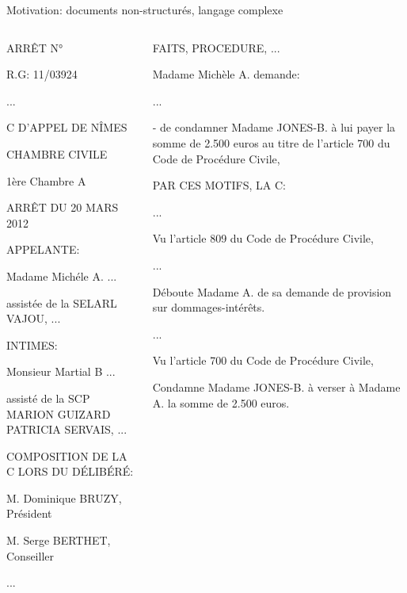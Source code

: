 \documentclass[newPxFont,pagenumber]{beamer}
\begin{document}
\begin{frame}{Motivation: documents non-structurés, langage complexe}
\scriptsize
\begin{columns}
\begin{column}{.50\linewidth}
ARRÊT N°

R.G: 11/03924

...

{C D'APPEL} DE {NÎMES}

{CHAMBRE CIVILE}

{1ère Chambre A}

ARRÊT DU {20 MARS 2012}

APPELANTE:

{Madame Michéle A.} ...

assistée de la {SELARL VAJOU}, ...

INTIMES:

{Monsieur Martial B} ...

assisté de la {SCP MARION GUIZARD PATRICIA SERVAIS}, ...

COMPOSITION DE LA C LORS DU DÉLIBÉRÉ:

{M. Dominique BRUZY, Président}

{M. Serge BERTHET, Conseiller}

...
\end{column}
\begin{column}{.50\linewidth}
FAITS, PROCEDURE, ...

Madame Michèle A. demande:

...

- de condamner Madame JONES-B. à lui payer la somme de {2.500 euros} au titre de l'{article 700 du Code de Procédure Civile}, 

\vspace{0.4cm}

PAR CES MOTIFS, LA C:

...

Vu l'{article 809 du Code de Procédure Civile},

...

{Déboute Madame A. de sa demande de provision sur dommages-intérêts.}

...

Vu l'{article 700 du Code de Procédure Civile},

Condamne Madame JONES-B. à verser à Madame A. la somme de {2.500 euros}.
\end{column}
\end{columns}
\end{frame}
\end{document}

